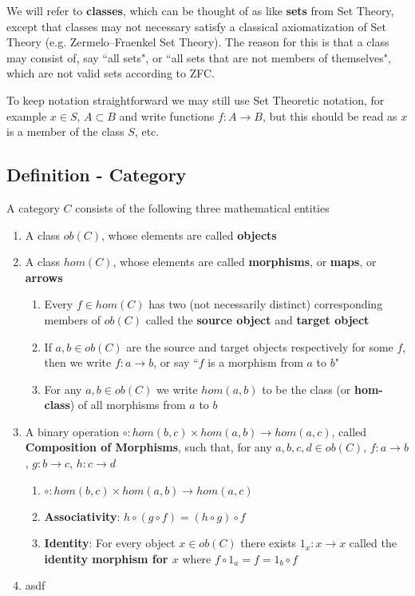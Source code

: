 \documentclass[9pt]{article} %
\begin{document}
We will refer to \textbf{classes}, which can be thought of as like \textbf{sets} from Set Theory, except that classes may not necessary satisfy a classical axiomatization of Set Theory (e.g. Zermelo–Fraenkel Set Theory).  The reason for this is that a class may consist of, say ``all sets", or ``all sets that are not members of themselves", which are not valid sets according to ZFC.

To keep notation straightforward we may still use Set Theoretic notation, for example $x \in S$, $A \subset B$ and write functions $f: A \rightarrow B$, but this should be read as $x$ is a member of the class $S$, etc.

\subsection{Definition - Category}

A category $C$ consists of the following three mathematical entities

\begin{enumerate}
    \item A class $ob(C)$, whose elements are called \textbf{objects}
    \item A class $hom(C)$, whose elements are called \textbf{morphisms}, or \textbf{maps}, or \textbf{arrows}
    \begin{enumerate}
        \item Every $f \in hom(C)$ has two (not necessarily distinct) corresponding members of $ob(C)$ called the \textbf{source object} and \textbf{target object}
        \item If $a, b \in ob(C)$ are the source and target objects respectively for some $f$, then we write $f: a \rightarrow b$, or say ``$f$ is a morphism from $a$ to $b$"
        \item For any $a, b \in ob(C)$ we write $hom(a, b)$ to be the class (or \textbf{hom-class}) of all morphisms from $a$ to $b$
    \end{enumerate}
    \item A binary operation $\circ: hom(b, c) \times hom(a, b) \rightarrow hom(a, c)$, called \textbf{Composition of Morphisms}, such that, for any $a, b, c, d \in ob(C)$, $f: a \rightarrow b$, $g: b \rightarrow c$, $h: c \rightarrow d$
    \begin{enumerate}
        \item $\circ: hom(b, c) \times hom(a, b) \rightarrow hom(a, c)$
        \item \textbf{Associativity}: $h \circ (g \circ f) = (h \circ g) \circ f$
        \item \textbf{Identity}: For every object $x \in ob(C)$ there exists $1_x: x \rightarrow x$ called the \textbf{identity morphism for $x$} where $f \circ 1_a = f = 1_b \circ f$
    \end{enumerate}
    \item asdf
\end{enumerate}
\end{document}
